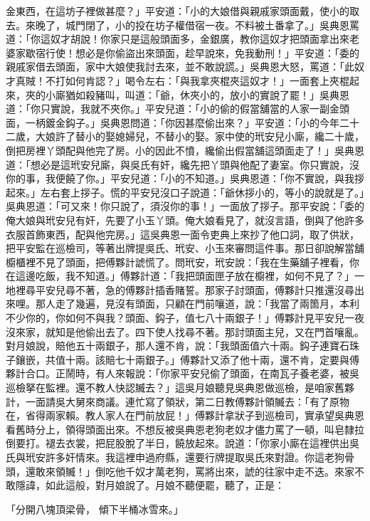 金東西，在這坊子裡做甚麼？」平安道：「小的大娘借與親戚家頭面戴，使小的取去。來晚了，城門閉了，小的投在坊子權借宿一夜。不料被土番拿了。」吳典恩罵道：「你這奴才胡說！你家只是這般頭面多，金銀廣，教你這奴才把頭面拿出來老婆家歇宿行使！想必是你偷盜出來頭面，趁早說來，免我動刑！」平安道：「委的親戚家借去頭面，家中大娘使我討去來，並不敢說謊。」吳典恩大怒，罵道：「此奴才真賊！不打如何肯認？」喝令左右：「與我拿夾棍夾這奴才！」一面套上夾棍起來，夾的小廝猶如殺豬叫，叫道：「爺，休夾小的，放小的實說了罷！」吳典恩道：「你只實說，我就不夾你。」平安兒道：「小的偷的假當舖當的人家一副金頭面，一柄鍍金鈎子。」吳典恩問道：「你因甚麼偷出來？」平安道：「小的今年二十二歲，大娘許了替小的娶媳婦兒，不替小的娶。家中使的玳安兒小廝，纔二十歲，倒把房裡丫頭配與他完了房。小的因此不憤，纔偷出假當舖這頭面走了！」吳典恩道：「想必是這玳安兒廝，與吳氏有奸，纔先把丫頭與他配了妻室。你只實說，沒你的事，我便饒了你。」平安兒道：「小的不知道。」吳典恩道：「你不實說，與我拶起來。」左右套上拶子。慌的平安兒沒口子說道：「爺休拶小的，等小的說就是了。」吳典恩道：「可又來！你只說了，須沒你的事！」一面放了拶子。那平安說：「委的俺大娘與玳安兒有奸，先要了小玉丫頭。俺大娘看見了，就沒言語，倒與了他許多衣服首飾東西，配與他完房。」這吳典恩一面令吏典上來抄了他口詞，取了供狀，把平安監在巡檢司，等著出牌提吳氏、玳安、小玉來審問這件事。那日卻說解當舖櫥櫃裡不見了頭面，把傅夥計諕慌了。問玳安，玳安說：「我在生藥舖子裡看，你在這邊吃飯，我不知道。」傅夥計道：「我把頭面匣子放在櫥裡，如何不見了？」一地裡尋平安兒尋不著，急的傅夥計插香賭誓。那家子討頭面，傅夥計只推還沒尋出來哩。那人走了幾遍，見沒有頭面，只顧在門前嚷道，說：「我當了兩箇月，本利不少你的，你如何不與我？頭面、鈎子，值七八十兩銀子！」傅夥計見平安兒一夜沒來家，就知是他偷出去了。四下使人找尋不著。那討頭面主兒，又在門首嚷亂。對月娘說，賠他五十兩銀子，那人還不肯，說：「我頭面值六十兩。鈎子連寶石珠子鑲嵌，共值十兩。該賠七十兩銀子。」傅夥計又添了他十兩，還不肯，定要與傅夥計合口。正鬧時，有人來報說：「你家平安兒偷了頭面，在南瓦子養老婆，被吳巡檢拏在監裡。還不教人快認贓去？」這吳月娘聽見吳典恩做巡檢，是咱家舊夥計，一面請吳大舅來商議。連忙寫了領狀，第二日教傅夥計領贓去：「有了原物在，省得兩家賴。教人家人在門前放屁！」傅夥計拿狀子到巡檢司，實承望吳典恩看舊時分上，領得頭面出來。不想反被吳典恩老狗老奴才儘力罵了一頓，叫皂隸拉倒要打。褪去衣裳，把屁股脫了半日，饒放起來。說道：「你家小廝在這裡供出吳氏與玳安許多奸情來。我這裡申過府縣，還要行牌提取吳氏來對證。你這老狗骨頭，還敢來領贓！」倒吃他千奴才萬老狗，罵將出來，諕的往家中走不迭。來家不敢隱諱，如此這般，對月娘說了。月娘不聽便罷，聽了，正是：

「分開八塊頂梁骨，  傾下半桶冰雪來。」

